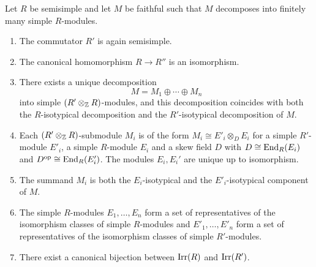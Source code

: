 \begin{theorem}
  Let $R$ be semisimple and let $M$ be faithful such that $M$ decomposes into finitely many simple $R$-modules.
  \begin{enumerate}
    \item
      The commutator $R'$ is again semisimple.
    \item
      The canonical homomorphism $R \to R''$ is an isomorphism.
    \item
      There exists a unique decomposition
      \[
          M
        = M_1 \oplus \dotsb \oplus M_n
      \]
      into simple $(R' \otimes_{\mathbb{Z}} R)$-modules, and this decomposition coincides with both the $R$-isotypical decomposition and the $R'$-isotypical decomposition of $M$.
    \item
      Each $(R' \otimes_{\mathbb{Z}} R)$-submodule $M_i$ is of the form $M_i \cong E'_i \otimes_D E_i$ for a simple $R'$-module $E'_i$, a simple $R$-module $E_i$ and a skew field $D$ with $D \cong \operatorname{End}_R(E_i)$ and $D^{\operatorname{op}} \cong \operatorname{End}_R(E'_i)$.
      The modules $E_i, E_i'$ are unique up to isomorphism.
    \item
      The summand $M_i$ is both the $E_i$-isotypical and the $E'_i$-isotypical component of $M$.
    \item
      The simple $R$-modules $E_1, \dotsc, E_n$ form a set of representatives of the isomorphism classes of simple $R$-modules and $E'_1, \dotsc, E'_n$ form a set of representatives of the isomorphism classes of simple $R'$-modules.
    \item
      There exist a canonical bijection between $\operatorname{Irr}(R)$ and $\operatorname{Irr}(R')$.
  \end{enumerate}
\end{theorem}



% 
% 
% 
% 
%   


